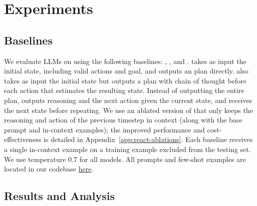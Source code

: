 \vspace{-1em}
\section{Experiments}
\vspace{-1em}

\subsection{Baselines}

We evaluate LLMs on \robotouille{} using the following baselines: \io{}, \iocot{}, and \react{}. \io{} takes as input the initial state, including valid actions and goal, and outputs an plan directly. \iocot{} \citep{wei2023chainofthoughtpromptingelicitsreasoning} also takes as input the initial state but outputs a plan with chain of thought before each action that estimates the resulting state. Instead of outputting the entire plan, \react{} \citep{yao2022react} outputs reasoning and the next action given the current state, and receives the next state before repeating. 
We use an ablated version of \react{} that only keeps the reasoning and action of the previous timestep in context (along with the base prompt and in-context examples); the improved performance and cost-effectiveness is detailed in Appendix~\ref{app:react-ablations}. 
Each baseline receives a single in-context example on a training example excluded from the testing set. We use temperature 0.7 for all models. All prompts and few-shot examples are located in our codebase \href{https://github.com/portal-cornell/robotouille}{here}.


\subsection{Results and Analysis}

